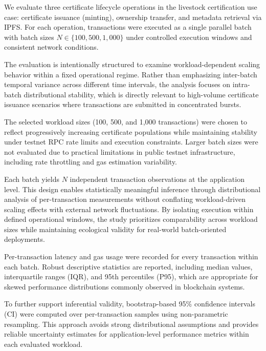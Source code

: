 \documentclass[pdflatex,sn-mathphys-num]{sn-jnl}
\begin{document}
We evaluate three certificate lifecycle operations in the livestock certification use case: certificate issuance (minting), ownership transfer, and metadata retrieval via IPFS. For each operation, transactions were executed as a single parallel batch with batch sizes $N \in \{100, 500, 1{,}000\}$ under controlled execution windows and consistent network conditions.

The evaluation is intentionally structured to examine workload-dependent scaling behavior within a fixed operational regime. Rather than emphasizing inter-batch temporal variance across different time intervals, the analysis focuses on intra-batch distributional stability, which is directly relevant to high-volume certificate issuance scenarios where transactions are submitted in concentrated bursts.

The selected workload sizes (100, 500, and 1,000 transactions) were chosen to reflect progressively increasing certificate populations while maintaining stability under testnet RPC rate limits and execution constraints. Larger batch sizes were not evaluated due to practical limitations in public testnet infrastructure, including rate throttling and gas estimation variability.

Each batch yields $N$ independent transaction observations at the application level. This design enables statistically meaningful inference through distributional analysis of per-transaction measurements without conflating workload-driven scaling effects with external network fluctuations. By isolating execution within defined operational windows, the study prioritizes comparability across workload sizes while maintaining ecological validity for real-world batch-oriented deployments.

Per-transaction latency and gas usage were recorded for every transaction within each batch. Robust descriptive statistics are reported, including median values, interquartile ranges (IQR), and 95th percentiles (P95), which are appropriate for skewed performance distributions commonly observed in blockchain systems.

To further support inferential validity, bootstrap-based 95\% confidence intervals (CI) were computed over per-transaction samples using non-parametric resampling. This approach avoids strong distributional assumptions and provides reliable uncertainty estimates for application-level performance metrics within each evaluated workload.
\end{document}
